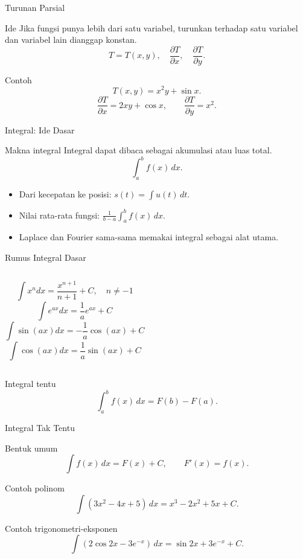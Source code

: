 \documentclass[aspectratio=169,11pt]{beamer}
\begin{document}
\begin{frame}{Turunan Parsial}
\begin{block}{Ide}
Jika fungsi punya lebih dari satu variabel, turunkan terhadap satu variabel dan variabel lain dianggap konstan.
\[
T=T(x,y),\quad \frac{\partial T}{\partial x},\quad \frac{\partial T}{\partial y}.
\]
\end{block}
\begin{exampleblock}{Contoh}
\[
T(x,y)=x^2y+\sin x.
\]
\[
\frac{\partial T}{\partial x}=2xy+\cos x,
\qquad
\frac{\partial T}{\partial y}=x^2.
\]
\end{exampleblock}
\end{frame}

\begin{frame}{Integral: Ide Dasar}
\begin{block}{Makna integral}
Integral dapat dibaca sebagai akumulasi atau luas total.
\[
\int_a^b f(x)\,dx.
\]
\end{block}
\begin{itemize}
  \item Dari kecepatan ke posisi: $s(t)=\int u(t)\,dt$.
  \item Nilai rata-rata fungsi: $\frac{1}{b-a}\int_a^b f(x)\,dx$.
  \item Laplace dan Fourier sama-sama memakai integral sebagai alat utama.
\end{itemize}
\end{frame}

\begin{frame}{Rumus Integral Dasar}
\begin{columns}
\[
\int x^n dx=\frac{x^{n+1}}{n+1}+C,\quad n\neq -1
\]
\[
\int e^{ax}dx=\frac{1}{a}e^{ax}+C
\]
\[
\int \sin(ax)dx=-\frac{1}{a}\cos(ax)+C
\]
\[
\int \cos(ax)dx=\frac{1}{a}\sin(ax)+C
\]
\end{columns}
\begin{block}{Integral tentu}
\[
\int_a^b f(x)\,dx=F(b)-F(a).
\]
\end{block}
\end{frame}


\begin{frame}{Integral Tak Tentu}
\begin{block}{Bentuk umum}
\[
\int f(x)\,dx=F(x)+C,
\qquad F'(x)=f(x).
\]
\end{block}
\begin{exampleblock}{Contoh polinom}
\[
\int(3x^2-4x+5)\,dx=x^3-2x^2+5x+C.
\]
\end{exampleblock}
\begin{exampleblock}{Contoh trigonometri-eksponen}
\[
\int(2\cos 2x-3e^{-x})\,dx=\sin 2x+3e^{-x}+C.
\]
\end{exampleblock}
\end{frame}
\end{document}
